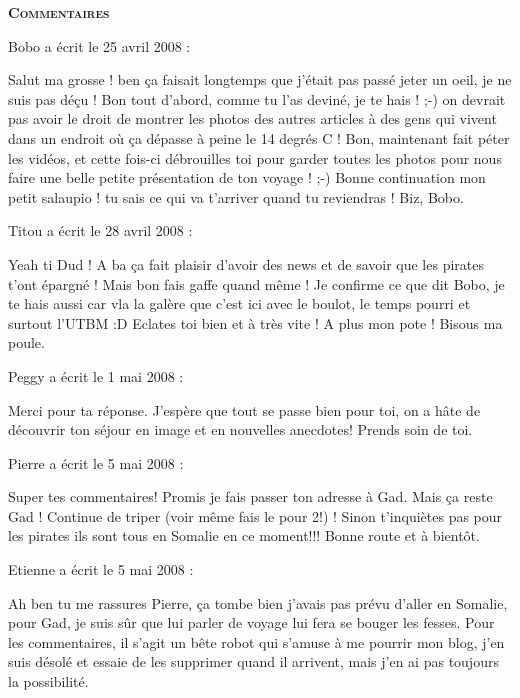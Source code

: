 \bigskip
\textbf{\textsc{Commentaires}}

\medskip
Bobo a écrit le 25 avril 2008 :
\begin{displayquote}
Salut ma grosse ! ben ça faisait longtemps que j'était pas passé jeter un oeil, je ne suis pas déçu !
Bon tout d'abord, comme tu l'as deviné, je te hais ! ;-) on devrait pas avoir le droit de montrer les photos des autres articles à des gens qui vivent dans un endroit où ça dépasse à peine le 14 degrés C !
Bon, maintenant fait péter les vidéos, et cette fois-ci débrouilles toi pour garder toutes les photos pour nous faire une belle petite présentation de ton voyage ! ;-)
Bonne continuation mon petit salaupio ! tu sais ce qui va t'arriver quand tu reviendras !
Biz, Bobo.
\end{displayquote}

\medskip
Titou a écrit le 28 avril 2008 :
\begin{displayquote}
Yeah ti Dud !
A ba ça fait plaisir d'avoir des news et de savoir que les pirates t'ont épargné ! Mais bon fais gaffe quand même !
Je confirme ce que dit Bobo, je te hais aussi car vla la galère que c'est ici avec le boulot, le temps pourri et surtout l'UTBM :D Eclates toi bien et à très vite !
A plus mon pote !
Bisous ma poule.
\end{displayquote}

\medskip
Peggy a écrit le 1 mai 2008 :
\begin{displayquote}
Merci pour ta réponse. J'espère que tout se passe bien pour toi, on a hâte de découvrir ton séjour en image et en nouvelles anecdotes!
Prends soin de toi.
\end{displayquote}

\medskip
Pierre a écrit le 5 mai 2008 :
\begin{displayquote}
Super tes commentaires!
Promis je fais passer ton adresse à Gad.
Mais ça reste Gad !
Continue de triper (voir même fais le pour 2!) !
Sinon t'inquiètes pas pour les pirates ils sont tous en Somalie en ce moment!!!
Bonne route et à bientôt.
\end{displayquote}

\medskip
Etienne a écrit le 5 mai 2008 :
\begin{displayquote}
Ah ben tu me rassures Pierre, ça tombe bien j'avais pas prévu d'aller en Somalie, pour Gad, je suis sûr que lui parler de voyage lui fera se bouger les fesses.
Pour les commentaires, il s'agit un bête robot qui s'amuse à me pourrir mon blog, j'en suis désolé et essaie de les supprimer quand il arrivent, mais j'en ai pas toujours la possibilité.
\end{displayquote}


